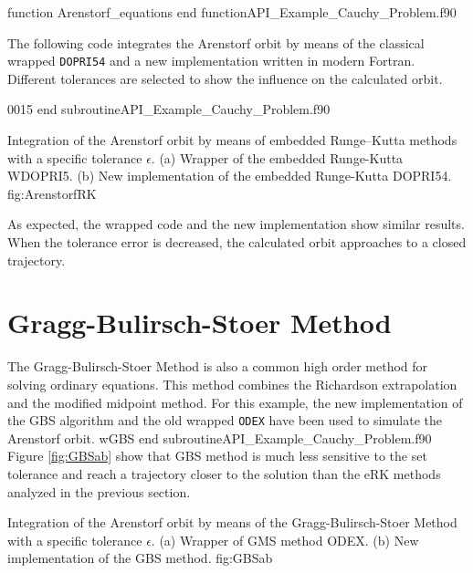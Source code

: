   \vspace{0.5cm} 
  {function Arenstorf_equations}
  {end function}{API_Example_Cauchy_Problem.f90}                   
  
  \newpage 
  The following code integrates the Arenstorf orbit by means of the classical wrapped \verb|DOPRI54| and a new implementation written in modern Fortran. 
  Different tolerances are selected to show the influence on the calculated orbit. 
  
  
  
  \vspace{0.5cm} 
  {0015}
  {end subroutine}{API_Example_Cauchy_Problem.f90}           
  
  
  
  
  
  \twographs{}
  {}
  {Integration of the Arenstorf orbit by means of embedded Runge--Kutta methods with a specific tolerance $\epsilon$.
      (a) Wrapper of the embedded Runge-Kutta WDOPRI5.
      (b) New implementation of the embedded Runge-Kutta DOPRI54. }
  {fig:ArenstorfRK}  
  
  As expected, the wrapped code and the new implementation show similar results. 
  When the tolerance error is decreased,  the calculated orbit approaches to a closed trajectory. 
  
  \newpage    
  \section{Gragg-Bulirsch-Stoer Method}
  The Gragg-Bulirsch-Stoer Method is also a common high order method for solving ordinary equations. This method combines the Richardson extrapolation and the modified midpoint method.
  For this example, the new implementation of the  GBS algorithm and the old wrapped \verb|ODEX| have been used to simulate the Arenstorf orbit. 
  {wGBS}
  {end subroutine}{API_Example_Cauchy_Problem.f90}  
  Figure \ref{fig:GBSab} show that GBS method is much less sensitive to the set tolerance and reach a trajectory closer to the solution than the eRK methods analyzed in the previous section.       
  
  \twographs{}
  {}
  {Integration of the Arenstorf orbit by means of the Gragg-Bulirsch-Stoer Method with a specific tolerance $\epsilon$.
      (a) Wrapper of GMS method ODEX.
      (b) New implementation of the GBS method. }
  {fig:GBSab}  
  
